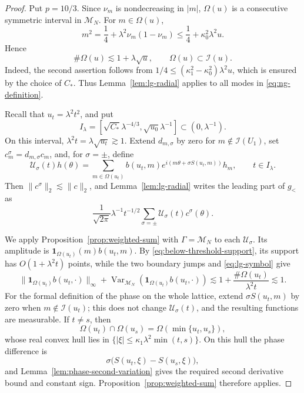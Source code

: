 \documentclass[10pt,a4paper]{amsart}
\numberwithin{equation}{section}
\newcommand{\norm}[1]{\lVert #1\rVert}
\begin{document}
\begin{proof}
Put \(p=10/3\). Since \(\nu_m\) is nondecreasing in \(|m|\),
\(\Omega(u)\) is a consecutive symmetric interval in \(\mathcal M_N\). For
\(m\in\Omega(u)\),
\[
 m^2=\frac14+\lambda^2\nu_m(1-\nu_m)
 \le\frac14+\kappa_0^2\lambda^2u.
\]
Hence
\begin{equation}\label{eq:below-threshold-support}
 \#\Omega(u)\lesssim1+\lambda\sqrt u,
 \qquad \Omega(u)\subset\mathcal I(u).
\end{equation}
Indeed, the second assertion follows from
\(1/4\le(\kappa_1^2-\kappa_0^2)\lambda^2u\), which is ensured by the
choice of \(C_*\). Thus Lemma~\ref{lem:lg-radial} applies to all modes in
\eqref{eq:ng-definition}.

Recall that \(u_t=\lambda^2t^2\), and put
\[
 I_\lambda=
 [\sqrt{C_*}\lambda^{-4/3},\sqrt{u_0}\lambda^{-1}]
 \subset(0,\lambda^{-1}).
\]
On this interval, \(\lambda^2t=\lambda\sqrt{u_t}\gtrsim1\). Extend \(d_{m,\sigma}\) by zero for \(m\notin\mathcal I(U_1)\), set
\(c_m^\sigma=d_{m,\sigma}c_m\), and, for \(\sigma=\pm\), define
\[
 \mathcal U_\sigma(t)h(\theta)
 =\sum_{m\in\Omega(u_t)}b(u_t,m)
 e^{i(m\theta+\sigma S(u_t,m))}h_m,
 \qquad t\in I_\lambda.
\]
Then \(\norm{c^\sigma}_2\lesssim\norm c_2\), and
Lemma~\ref{lem:lg-radial} writes the leading part of \(g_<\) as
\[
 \frac1{\sqrt{2\pi}}\lambda^{-1}t^{-1/2}
 \sum_{\sigma=\pm}\mathcal U_\sigma(t)c^\sigma(\theta).
\]

We apply Proposition~\ref{prop:weighted-sum} with
\(\Gamma=\mathcal M_N\) to each \(\mathcal U_\sigma\). Its amplitude is
\(\mathbf1_{\Omega(u_t)}(m)b(u_t,m)\). By
\eqref{eq:below-threshold-support}, its support has
\(O(1+\lambda^2t)\) points, while the two boundary jumps and
\eqref{eq:lg-symbol} give
\[
 \norm{\mathbf1_{\Omega(u_t)}b(u_t,\cdot)}_\infty
 +\operatorname{Var}_{\mathcal M_N}
   (\mathbf1_{\Omega(u_t)}b(u_t,\cdot))
 \lesssim1+\frac{\#\Omega(u_t)}{\lambda^2t}
 \lesssim1.
\]
For the formal definition of the phase on the whole lattice, extend
\(\sigma S(u_t,m)\) by zero when \(m\notin\mathcal I(u_t)\); this does not
change \(\mathcal U_\sigma(t)\), and the resulting functions are measurable.
If \(t\ne s\), then
\[
 \Omega(u_t)\cap\Omega(u_s)=\Omega(\min\{u_t,u_s\}),
\]
whose real convex hull lies in
\(\{|\xi|\le\kappa_1\lambda^2\min(t,s)\}\). On this hull the phase
difference is
\[
 \sigma\bigl(S(u_t,\xi)-S(u_s,\xi)\bigr),
\]
and Lemma~\ref{lem:phase-second-variation} gives the required second
derivative bound and constant sign. Proposition~\ref{prop:weighted-sum}
therefore applies.


\end{proof}
\end{document}
